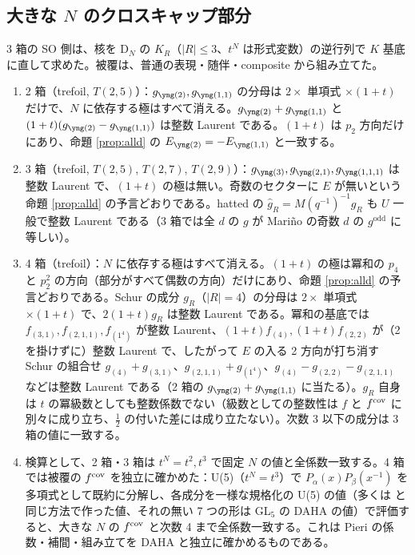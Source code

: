 \subsection{大きな $N$ のクロスキャップ部分}
3 箱の SO 側は、核を D$_N$ の $K_R$（$|R| \le 3$、$t^N$ は形式変数）の逆行列で $K$ 基底に直して求めた。被覆は、普通の表現・随伴・composite から組み立てた。
\begin{compresult}\label{cr:largeN}
\begin{enumerate}
\item 2 箱（trefoil, $T(2,5)$）：$g_{\ytwo}, g_{\yoneone}$ の分母は $2\times$ 単項式 $\times(1+t)$ だけで、$N$ に依存する極はすべて消える。$g_{\ytwo} + g_{\yoneone}$ と $(1+t)(g_{\ytwo} - g_{\yoneone})$ は整数 Laurent である。$(1+t)$ は $p_2$ 方向だけにあり、命題 \ref{prop:alld} の $E_{\ytwo} = -E_{\yoneone}$ と一致する。
\item 3 箱（trefoil, $T(2,5)$, $T(2,7)$, $T(2,9)$）：$g_{\ythree}, g_{\ytwoone}, g_{\yoneoneone}$ は整数 Laurent で、$(1+t)$ の極は無い。奇数のセクターに $E$ が無いという命題 \ref{prop:alld} の予言どおりである。hatted の $\hat g_R = M(q^{-1})^{-1} g_R$ も $U$ 一般で整数 Laurent である（3 箱では全 $d$ の $g$ が Mariño の奇数 $d$ の $g^{\mathrm{odd}}$ に等しい）。
\item 4 箱（trefoil）：$N$ に依存する極はすべて消える。$(1+t)$ の極は冪和の $p_4$ と $p_2^2$ の方向（部分がすべて偶数の方向）だけにあり、命題 \ref{prop:alld} の予言どおりである。Schur の成分 $g_R$（$|R| = 4$）の分母は $2\times$ 単項式 $\times(1+t)$ で、$2(1+t)g_R$ は整数 Laurent である。冪和の基底では $f_{(3,1)}, f_{(2,1,1)}, f_{(1^4)}$ が整数 Laurent、$(1+t)f_{(4)}, (1+t)f_{(2,2)}$ が（2 を掛けずに）整数 Laurent で、したがって $E$ の入る 2 方向が打ち消す Schur の組合せ $g_{(4)} + g_{(3,1)}$、$g_{(2,1,1)} + g_{(1^4)}$、$g_{(4)} - g_{(2,2)} - g_{(2,1,1)}$ などは整数 Laurent である（2 箱の $g_{\ytwo} + g_{\yoneone}$ に当たる）。$g_R$ 自身は $t$ の冪級数としても整数係数でない（級数としての整数性は $f$ と $f^{\mathrm{cov}}$ に別々に成り立ち、$\tfrac12$ の付いた差には成り立たない）。次数 3 以下の成分は 3 箱の値に一致する。
\item 検算として、2 箱・3 箱は $t^N = t^2, t^3$ で固定 $N$ の値と全係数一致する。4 箱では被覆の $f^{\mathrm{cov}}$ を独立に確かめた：U(5)（$t^N = t^3$）で $P_\alpha(x)P_\beta(x^{-1})$ を多項式として既約に分解し、各成分を一様な規格化の U(5) の値（多くは \cite{KN17} と同じ方法で作った値、それの無い 7 つの形は GL$_5$ の DAHA の値）で評価すると、大きな $N$ の $f^{\mathrm{cov}}$ と次数 4 まで全係数一致する。これは Pieri の係数・補間・組み立てを DAHA と独立に確かめるものである。
\end{enumerate}
\end{compresult}

